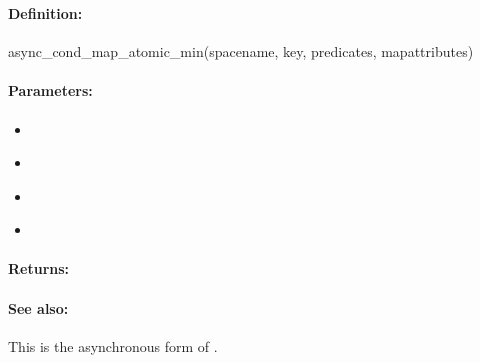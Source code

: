\pagebreak
\subsubsection{}
\label{api:ruby:async_cond_map_atomic_min}


\paragraph{Definition:}
\begin{rubycode}
async_cond_map_atomic_min(spacename, key, predicates, mapattributes)
\end{rubycode}

\paragraph{Parameters:}
\begin{itemize}[noitemsep]
\item {}\\

\item {}\\

\item {}\\

\item {}\\

\end{itemize}

\paragraph{Returns:}


\paragraph{See also:}  This is the asynchronous form of .

\pagebreak
\subsubsection{}
\label{api:ruby:map_atomic_max}


